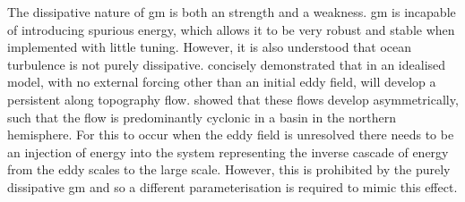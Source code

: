 \documentclass[10pt,a4paper]{article}
\begin{document}
        The dissipative nature of \gls{gm} is both an strength and a
         weakness. \gls{gm} is incapable of introducing spurious energy,
         which allows it to be very robust and stable when implemented 
         with little tuning. However, it is also understood that
         ocean turbulence is not purely dissipative.
          \cite{adcock2000interactions} concisely demonstrated that
         in an idealised model, with no external forcing other
         than an initial eddy field, will develop a persistent along
         topography flow. \cite{nost2008asymmetry} showed that these
         flows develop asymmetrically, such that the flow is 
         predominantly cyclonic in
         a basin in the northern hemisphere. For this to occur 
         when the eddy field is unresolved there needs to be an 
         injection of energy into the system representing the 
         inverse cascade of energy from the eddy scales to the large scale.
         However, this is prohibited by the purely dissipative \gls{gm}
         and so a different parameterisation is required to mimic this
         effect.
         
\end{document}
